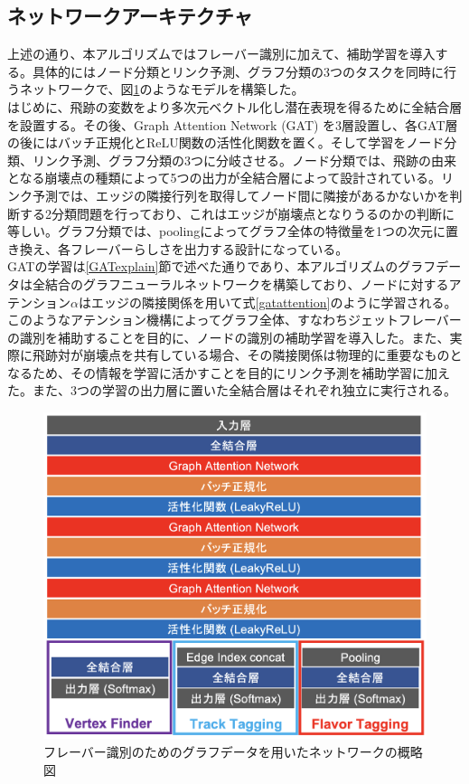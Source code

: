 \subsection{ネットワークアーキテクチャ}
上述の通り、本アルゴリズムではフレーバー識別に加えて、補助学習を導入する。具体的にはノード分類とリンク予測、グラフ分類の3つのタスクを同時に行うネットワークで、図\ref{gnnmodel}のようなモデルを構築した。\\
はじめに、飛跡の変数をより多次元ベクトル化し潜在表現を得るために全結合層を設置する。その後、Graph Attention Network (GAT) を3層設置し、各GAT層の後にはバッチ正規化とReLU関数の活性化関数を置く。そして学習をノード分類、リンク予測、グラフ分類の3つに分岐させる。ノード分類では、飛跡の由来となる崩壊点の種類によって5つの出力が全結合層によって設計されている。リンク予測では、エッジの隣接行列を取得してノード間に隣接があるかないかを判断する2分類問題を行っており、これはエッジが崩壊点となりうるのかの判断に等しい。グラフ分類では、poolingによってグラフ全体の特徴量を1つの次元に置き換え、各フレーバーらしさを出力する設計になっている。\\
GATの学習は\ref{GATexplain}節で述べた通りであり、本アルゴリズムのグラフデータは全結合のグラフニューラルネットワークを構築しており、ノードに対するアテンション$\alpha$はエッジの隣接関係を用いて式\ref{gatattention}のように学習される。このようなアテンション機構によってグラフ全体、すなわちジェットフレーバーの識別を補助することを目的に、ノードの識別の補助学習を導入した。また、実際に飛跡対が崩壊点を共有している場合、その隣接関係は物理的に重要なものとなるため、その情報を学習に活かすことを目的にリンク予測を補助学習に加えた。また、3つの学習の出力層に置いた全結合層はそれぞれ独立に実行される。\\
\begin{figure}[H]
	\begin{center}
 \includegraphics[keepaspectratio, scale=0.4]
 	{Figure/Flavortagging/gnn.png}
 		\caption{フレーバー識別のためのグラフデータを用いたネットワークの概略図}
 		\label{gnnmodel}
	\end{center}
\end{figure}
